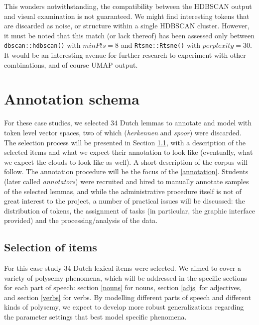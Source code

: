 \documentclass[
]{book}
\begin{document}
This wonders notwithstanding, the compatibility between the HDBSCAN output and visual examination is not guaranteed. We might find interesting tokens that are discarded as noise, or structure within
a single HDBSCAN cluster. However, it must be noted that this match (or lack thereof)
has been assessed only between \texttt{dbscan::hdbscan()} with \(minPts = 8\) and
\texttt{Rtsne::Rtsne()} with \(perplexity = 30\). It would be an interesting avenue for further research to experiment with other combinations, and of course UMAP output.

\hypertarget{annotation-schema}{%
\chapter{Annotation schema}\label{annotation-schema}}

For these case studies, we selected 34 Dutch lemmas to annotate and model with token level vector spaces, two of which (\emph{herkennen} and \emph{spoor}) were discarded.
The selection process will be presented in Section \ref{selection}, with a description of the selected items and what we expect their annotation to look like (eventually, what we expect the clouds to look like as well). A short description of the corpus \autocite[QLVLNewsCorpus,][]{depascale_2019} will follow. The annotation procedure will be the focus of the \ref{annotation}.
Students (later called \emph{annotators}) were recruited and hired to manually annotate samples of the selected lemmas, and while the administrative procedure itself is not of great interest to the project, a number of practical issues will be discussed: the distribution of tokens, the assignment of tasks (in particular, the graphic interface provided) and the processing/analysis of the data.

\hypertarget{selection}{%
\section{Selection of items}\label{selection}}

For this case study 34 Dutch lexical items were selected. We aimed to cover a variety of polysemy phenomena, which will be addressed in the specific sections for each part of speech: section \ref{nouns} for nouns, section \ref{adjs} for adjectives, and section \ref{verbs} for verbs.
By modelling different parts of speech and different kinds of polysemy, we expect to develop more robust generalizations regarding the parameter settings that best model specific phenomena.
\end{document}
